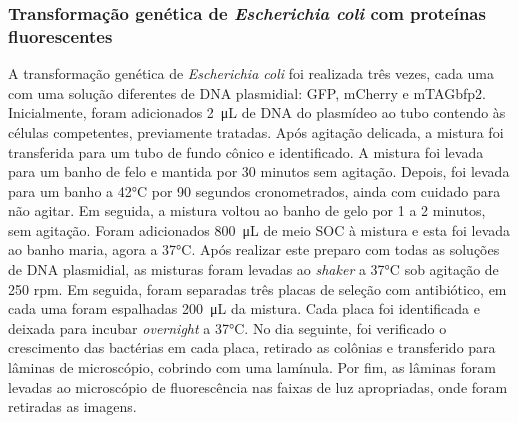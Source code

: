 \subsubsection{Transformação genética de \textit{Escherichia coli} com proteínas
fluorescentes}
A transformação genética de \textit{Escherichia coli} foi realizada três vezes,
cada uma com uma solução diferentes de DNA plasmidial: GFP, mCherry e
mTAGbfp2. Inicialmente, foram adicionados \qty{2}{\micro\liter} de DNA do
plasmídeo ao tubo contendo às células competentes, previamente tratadas. Após
agitação delicada, a mistura foi transferida para um tubo de fundo cônico e
identificado. A mistura foi levada para um banho de felo e mantida por 30
minutos sem agitação. Depois, foi levada para um banho a 42°C por 90 segundos
cronometrados, ainda com cuidado para não agitar. Em seguida, a mistura voltou
ao banho de gelo por 1 a 2 minutos, sem agitação. Foram adicionados
\qty{800}{\micro\liter} de meio SOC à mistura e esta foi levada ao banho maria,
agora a 37°C. Após realizar este preparo com todas as soluções de DNA
plasmidial, as misturas foram levadas ao \textit{shaker} a 37°C sob agitação de
250 rpm. Em seguida, foram separadas três placas de seleção com antibiótico, em
cada uma foram espalhadas \qty{200}{\micro\liter} da mistura. Cada placa foi
identificada e deixada para incubar \textit{overnight} a 37°C. No dia seguinte, foi
verificado o crescimento das bactérias em cada placa, retirado as colônias e
transferido para lâminas de microscópio, cobrindo com uma lamínula. Por fim, as
lâminas foram levadas ao microscópio de fluorescência nas faixas de luz
apropriadas, onde foram retiradas as imagens.
